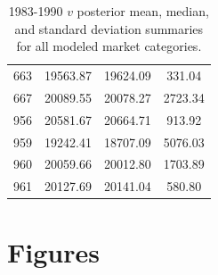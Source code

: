 \documentclass[12pt]{article}
\begin{document}
\begin{table}[h!]
\begin{minipage}[c]{0.45\textwidth}
\begin{tabular}{cccc}
663 & 19563.87 & 19624.09 & 331.04      \\
667 & 20089.55 & 20078.27 & 2723.34     \\
956 & 20581.67 & 20664.71 & 913.92      \\
959 & 19242.41 & 18707.09 & 5076.03     \\
960 & 20059.66 & 20012.80 & 1703.89     \\
961 & 20127.69 & 20141.04 & 580.80      \\
\hline
\end{tabular}
\caption{1983-1990 $v$ posterior mean, median, and standard deviation  
summaries for all modeled market categories.}
\label{v83}
\end{minipage}
\end{table}

\clearpage

%
%
\section{Figures}
%
%
\end{document}
